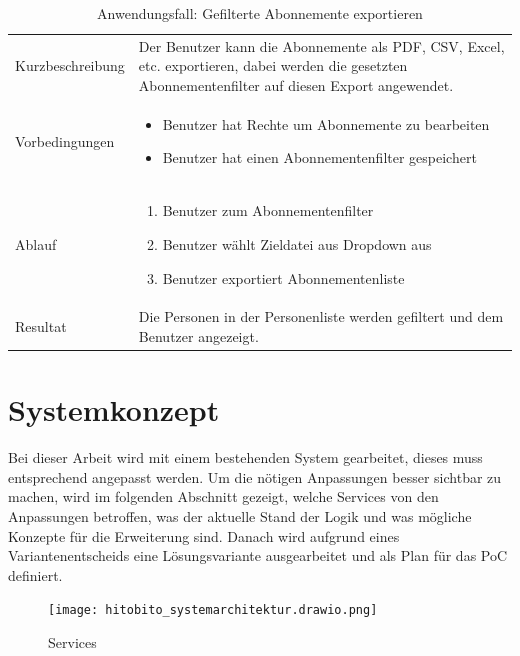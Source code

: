 \begin{table}[h!]
   \begin{tabular}{|L{0.3\textwidth}|L{0.6\textwidth}|}
      \hline
        \\[4pt]
      \hline
      Kurzbeschreibung & Der Benutzer kann die Abonnemente als PDF, CSV, Excel, etc. exportieren, dabei werden
      die gesetzten Abonnementenfilter auf diesen Export angewendet. \\
      \hline
      Vorbedingungen & \begin{itemize}
         \item Benutzer hat Rechte um Abonnemente zu bearbeiten
         \item Benutzer hat einen Abonnementenfilter gespeichert
         \end{itemize}  \\
      \hline
      Ablauf & \begin{enumerate}
      \item Benutzer zum Abonnementenfilter
      \item Benutzer wählt Zieldatei aus Dropdown aus
      \item Benutzer exportiert Abonnementenliste
      \end{enumerate}  \\
      \hline
      Resultat & Die Personen in der Personenliste werden gefiltert und dem Benutzer angezeigt. \\
      \hline
   \end{tabular}
   \caption{Anwendungsfall: Gefilterte Abonnemente exportieren}
\end{table}

\newpage

\section{Systemkonzept}
Bei dieser Arbeit wird mit einem bestehenden System gearbeitet, dieses muss entsprechend angepasst werden. 
Um die nötigen Anpassungen besser sichtbar zu machen, wird im folgenden Abschnitt gezeigt, welche Services von den 
Anpassungen betroffen, was der aktuelle Stand der Logik und was mögliche Konzepte für die Erweiterung sind. Danach wird aufgrund
eines Variantenentscheids eine Lösungsvariante ausgearbeitet und als Plan für das PoC definiert.

\begin{figure}[h]
   \centering
   \texttt{[image: hitobito\_systemarchitektur.drawio.png]}
   \caption{Services}
\end{figure}

